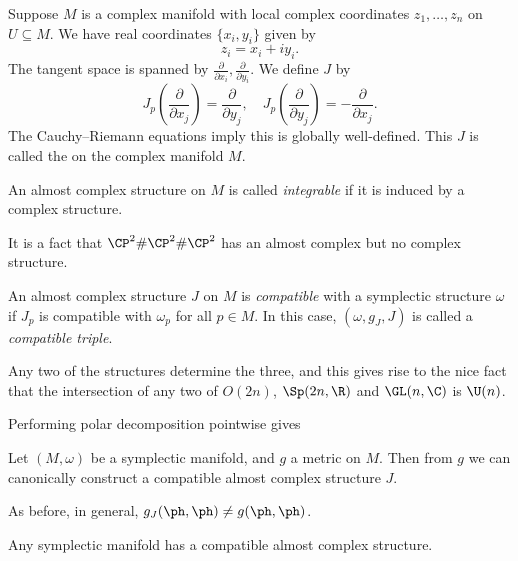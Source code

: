 \documentclass[a4paper]{article}
\begin{document}
\begin{eg}
  Suppose $M$ is a complex manifold with local complex coordinates $z_1, \ldots, z_n$ on $U \subseteq M$. We have real coordinates $\{x_i, y_i\}$ given by
  \[
    z_i = x_i + i y_i.
  \]
  The tangent space is spanned by $\frac{\partial}{\partial x_i}, \frac{\partial }{\partial y_i}$. We define $J$ by
  \[
    J_p\left(\frac{\partial}{\partial x_j}\right) = \frac{\partial}{\partial y_j},\quad J_p\left(\frac{\partial}{\partial y_j}\right) = - \frac{\partial}{\partial x_j}.
  \]
  The Cauchy--Riemann equations imply this is globally well-defined. This $J$ is called the  on the complex manifold $M$.
\end{eg}
\begin{defi}
  An almost complex structure on $M$ is called \emph{integrable} if it is induced by a complex structure.
\end{defi}

\begin{eg}
  It is a fact that $\CP^2 \# \CP^2 \# \CP^2$ has an almost complex but no complex structure.
\end{eg}

\begin{defi}
  An almost complex structure $J$ on $M$ is \emph{compatible} with a symplectic structure $\omega$ if $J_p$ is compatible with $\omega_p$ for all $p \in M$. In this case, $(\omega, g_J, J)$ is called a \emph{compatible triple}.
\end{defi}
Any two of the structures determine the three, and this gives rise to the nice fact that the intersection of any two of $O(2n)$, $\Sp(2n, \R)$ and $\GL(n, \C)$ is $\U(n)$.

Performing polar decomposition pointwise gives
\begin{prop}
  Let $(M, \omega)$ be a symplectic manifold, and $g$ a metric on $M$. Then from $g$ we can canonically construct a compatible almost complex structure $J$.\fakeqed
\end{prop}

As before, in general, $g_J(\ph, \ph)\not= g(\ph, \ph)$.

\begin{cor}
  Any symplectic manifold has a compatible almost complex structure.\fakeqed
\end{cor}
\end{document}
